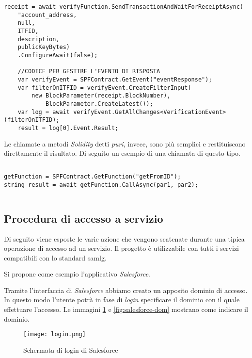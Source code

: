 \begin{lstlisting}[caption={Creazione del contratto},label={lst:transax},language={[Sharp]C}]
receipt = await verifyFunction.SendTransactionAndWaitForReceiptAsync(
    "account_address,
    null, 
    ITFID,
    description, 
    publicKeyBytes)
    .ConfigureAwait(false);          

    //CODICE PER GESTIRE L'EVENTO DI RISPOSTA
    var verifyEvent = SPFContract.GetEvent("eventResponse");
    var filterOnITFID = verifyEvent.CreateFilterInput(
        new BlockParameter(receipt.BlockNumber),
            BlockParameter.CreateLatest());
    var log = await verifyEvent.GetAllChanges<VerificationEvent>(filterOnITFID);
    result = log[0].Event.Result;
\end{lstlisting}


Le chiamate a metodi \emph{Solidity} detti \emph{puri}, invece, sono più semplici e restituiscono direttamente il risultato.
Di seguito un esempio di una chiamata di questo tipo.

\begin{lstlisting}[caption={Esempio di chiamata a metodo puro},label={lst:call_ex},language={[Sharp]C}]

getFunction = SPFContract.GetFunction("getFromID");
string result = await getFunction.CallAsync(par1, par2);
    
\end{lstlisting}


\subsection{Procedura di accesso a servizio}
Di seguito viene esposte le varie azione che vengono scatenate durante una tipica operazione di accesso ad un servizio. Il progetto è utilizzabile con tutti i servizi compatibili con lo standard \gls{samlg}.

\noindent Si propone come esempio l'applicativo \emph{Salesforce}.

Tramite l'interfaccia di \emph{Salesforce} abbiamo creato un apposito dominio di accesso. In questo modo l'utente potrà in fase di \emph{login} specificare il dominio con il quale effettuare l'accesso.
Le immagini \ref{fig:salesforce-login} e \ref{fig:salesforce-dom} mostrano come indicare il dominio.

\begin{figure}[!h]
    
    \centering
    \texttt{[image: login.png]} 
    \caption{Schermata di login di Salesforce}
    \label{fig:salesforce-login} 
\end{figure}

